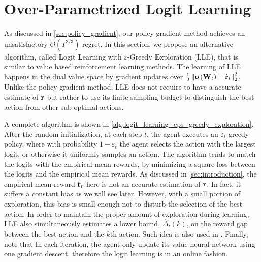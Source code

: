 \section{Over-Parametrized Logit Learning}
\label{sec:logit_learning}

As discussed in \cref{sec:policy_gradient}, our policy gradient method achieves an unsatisfactory $\tilde{O}(T^{2/3})$ regret.
In this section, we propose an alternative algorithm, called {\bf L}ogit {\bf L}earning with $\varepsilon$-Greedy {\bf E}xploration (LLE), that is similar to value based reinforcement learning methods.
The learning of LLE happens in the dual value space by gradient updates over $\frac{1}{2} \left\| {\mathbf{o}}\left( {\mathbf{W}}_t\right) - \hat{{\mathbf{r}}}_t \right\|_2^2$.
Unlike the policy gradient method, LLE does not require to have a accurate estimate of ${\mathbf{r}}$ but rather to use its finite sampling budget to distinguish the best action from other sub-optimal actions.

A complete algorithm is shown in \cref{alg:logit_learning_eps_greedy_exploration}. 
After the random initialization, at each step $t$, the agent executes an $\varepsilon_t$-greedy policy, where with probability $1 - \varepsilon_t$ the agent selects the action with the largest logit, or otherwise it uniformly samples an action.
The algorithm tends to match the logits with the empirical mean rewards, by minimizing a square loss between the logits and the empirical mean rewards.
As discussed in \cref{sec:introduction}, the empirical mean reward $\hat{{\mathbf{r}}}_t$ here is not an accurate estimation of ${\mathbf{r}}$. In fact, it suffers a constant bias as we will see later.
However, with a small portion of exploration, this bias is small enough not to disturb the selection of the best action.
In order to maintain the proper amount of exploration during learning, 
LLE also simultaneously estimates a lower bound, $\hat{\Delta}_t(k)$, on the reward gap between the best action and the $k$th action. 
Such idea is also used in  \cite{seldin2017improved}.
Finally, note that In each iteration, the agent only update its value neural network using one gradient descent, therefore the logit learning is in an online fashion.

